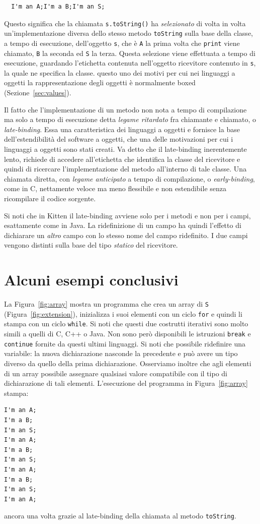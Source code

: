 %
\begin{verbatim}
  I'm an A;I'm a B;I'm an S;
\end{verbatim}
%
Questo significa che la chiamata \texttt{s.toString()} ha
\emph{selezionato} di volta in volta
un'implementazione diversa dello stesso metodo \texttt{toString} sulla base
della classe, a tempo di esecuzione, dell'oggetto \texttt{s}, che \`e \texttt{A} la prima volta che
\texttt{print} viene chiamato, \e \texttt{B} la seconda ed \e \texttt{S} la
terza. Questa selezione viene effettuata a tempo di esecuzione,
guardando l'etichetta contenuta nell'oggetto ricevitore contenuto
in \texttt{s}, la quale ne specifica la classe. \E questo uno dei motivi
per cui nei linguaggi a oggetti la rappresentazione degli oggetti \`e
normalmente boxed (Sezione~\ref{sec:values}).

Il fatto che l'implementazione di un metodo non \e nota a tempo di compilazione
ma solo a tempo di esecuzione \e detta \emph{legame ritardato} fra
chiamante e chiamato, o \emph{late-binding}. Essa \e una caratteristica dei
linguaggi a oggetti e fornisce la base dell'estendibilit\`a del
software a oggetti, che \e una
delle motivazioni per cui i linguaggi a oggetti sono stati creati. Va detto
che il late-binding \e inerentemente lento, \poiche richiede di accedere
all'etichetta che identifica la classe del ricevitore e quindi di ricercare
l'implementazione del metodo all'interno di tale classe. Una chiamata diretta,
con \emph{legame anticipato} a tempo di compilazione, o \emph{early-binding},
come in C, \e nettamente \piu veloce ma meno flessibile e non estendibile
senza ricompilare il codice sorgente.

Si noti che in Kitten il late-binding avviene solo per i metodi e non per i campi,
esattamente come in Java. La ridefinizione di un campo
ha quindi l'effetto di dichiarare un \emph{altro} campo con lo stesso nome del
campo ridefinito. I due campi vengono distinti sulla base del tipo
\emph{statico} del ricevitore.
%
\section{Alcuni esempi conclusivi}\label{sec:big_example}
%
La Figura~\ref{fig:array} mostra un programma che crea un array
di \texttt{S} (Figura~\ref{fig:extension}), inizializza i suoi
elementi con un ciclo \texttt{for} e quindi li stampa con un ciclo
\texttt{while}. Si noti che questi due costrutti iterativi sono molto simili
a quelli di C, C++ o Java. Non sono per\`o disponibili le istruzioni
\texttt{break} e \texttt{continue} fornite da questi ultimi linguaggi.
Si noti che \e possibile ridefinire una variabile: la nuova
dichiarazione nasconde la precedente e pu\`o avere un tipo diverso da
quello della prima dichiarazione. Osserviamo inoltre che agli elementi
di un array \e possibile assegnare qualsiasi valore compatibile con il
tipo di dichiarazione di tali elementi. L'esecuzione del programma
in Figura~\ref{fig:array} stampa:
%
\begin{verbatim}
I'm an A;
I'm a B;
I'm an S;
I'm an A;
I'm a B;
I'm an S;
I'm an A;
I'm a B;
I'm an S;
I'm an A;
\end{verbatim}
%
ancora una volta grazie al late-binding della chiamata al metodo \texttt{toString}.

